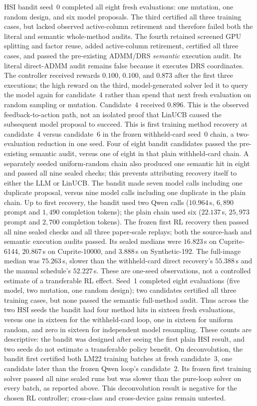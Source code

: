 HSI bandit seed~0 completed all
eight fresh evaluations: one mutation, one random design, and six model
proposals. The third certified all three training cases, but lacked observed
active-column retirement and therefore failed both the literal and semantic
whole-method audits. The fourth retained screened GPU splitting and factor
reuse, added active-column retirement, certified all three cases, and
passed the pre-existing ADMM/DRS \emph{semantic} execution audit. Its literal
direct-ADMM audit remains false because it executes DRS coordinates.
The controller received rewards $0.100$, $0.100$, and $0.873$ after the first
three executions; the high reward on the third, model-generated solver led it
to query the model again for candidate~4 rather than spend that next fresh
evaluation on random sampling or mutation. Candidate~4 received $0.896$.
This is the observed feedback-to-action path, not an isolated proof that
LinUCB caused the subsequent model proposal to succeed.
This is first training method recovery at candidate~4 versus candidate~6 in
the frozen withheld-card seed~0 chain, a two-evaluation reduction in one
seed. Four of eight bandit candidates passed the pre-existing semantic audit,
versus one of eight in that plain withheld-card chain. A separately seeded
uniform-random chain also produced one semantic hit in eight and passed all
nine sealed checks; this prevents attributing recovery itself to either the
LLM or LinUCB. The bandit made seven
model calls including one duplicate proposal, versus nine model calls
including one duplicate in the plain chain. Up to first recovery, the bandit
used two Qwen calls ($10.964$\,s, $6{,}890$ prompt and $1{,}490$ completion
tokens); the plain chain used six ($22.137$\,s, $25{,}973$ prompt and $2{,}700$
completion tokens). The frozen first RL recovery then
passed all nine sealed checks and all three paper-scale replays; both the
source-hash and semantic execution audits passed. Its sealed medians were
$16.823$\,s on Cuprite-6144, $20.867$\,s on Cuprite-10000, and $3.888$\,s
on Synthetic-192. The full-image median was $75.263$\,s, slower than the
withheld-card direct recovery's $55.388$\,s and the manual schedule's
$52.227$\,s. These are one-seed observations, not a controlled estimate of a
transferable RL effect.
Seed~1 completed eight evaluations (five model, two mutation, one random
design); two candidates certified all three training cases, but none passed
the semantic full-method audit. Thus across the two HSI seeds the bandit had
four method hits in sixteen fresh evaluations, versus one in sixteen for the
withheld-card loop, one in sixteen for uniform random, and zero in sixteen for
independent model resampling. These counts are descriptive: the bandit was
designed after seeing the first plain HSI result, and two seeds do not estimate
a transferable policy benefit. On
deconvolution, the bandit first certified both LM22 training
batches at fresh candidate~3, one candidate later than the frozen Qwen loop's
candidate~2. Its frozen first training solver passed all nine sealed runs but
was slower than the pure-loop solver on every batch, as reported above.
This deconvolution result is negative for the chosen RL controller;
cross-class and cross-device gains remain untested.

